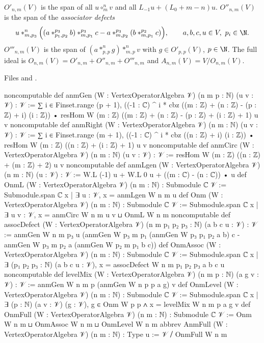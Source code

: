\begin{definition}\label{l13:def:onm}
$O'_{n,m}(V)$ is the span of all $u\circ^n_mv$ and all $L_{-1}u+(L_0+m-n)u$. $O''_{n,m}(V)$ is the span of the
\emph{associator defects}
\begin{equation*}
 u*^n_{m,p_3}\Bigl((a*^{p_3}_{p_1,p_2}b)*^{p_3}_{m,p_1}c - a*^{p_3}_{m,p_2}(b*^{p_2}_{m,p_1}c)\Bigr),\qquad a,b,c,u\in V,\ p_i\in\N.
\end{equation*}
$O'''_{n,m}(V)$ is the span of $(a*^n_{p,p}g)*^n_{m,p}v$ with $g\in O'_{p,p}(V)$, $p\in\N$. The full ideal is
$O_{n,m}(V) = O'_{n,m}+O''_{n,m}+O'''_{n,m}$ and $A_{n,m}(V) = V/O_{n,m}(V)$.
\end{definition}
\noindent Files  and
.
\begin{leancode}
noncomputable def anmGen (W : VertexOperatorAlgebra 𝒱) (n m p : ℕ) (u v : 𝒱) : 𝒱 :=
  ∑ i ∈ Finset.range (p + 1),
    ((-1 : ℂ) ^ i * cbz ((m : ℤ) + (n : ℤ) - (p : ℤ) + i) (i : ℤ))
      • resHom W (m : ℤ) ((m : ℤ) + (n : ℤ) - (p : ℤ) + (i : ℤ) + 1) u v
noncomputable def anmRight (W : VertexOperatorAlgebra 𝒱) (n m : ℕ) (u v : 𝒱) : 𝒱 :=
  ∑ i ∈ Finset.range (m + 1),
    ((-1 : ℂ) ^ i * cbz ((n : ℤ) + i) (i : ℤ)) • resHom W (m : ℤ) ((n : ℤ) + (i : ℤ) + 1) u v
noncomputable def anmCirc (W : VertexOperatorAlgebra 𝒱) (n m : ℕ) (u v : 𝒱) : 𝒱 :=
  resHom W (m : ℤ) ((n : ℤ) + (m : ℤ) + 2) u v
noncomputable def anmLgen (W : VertexOperatorAlgebra 𝒱) (n m : ℕ) (u : 𝒱) : 𝒱 :=
  W.L (-1) u + W.L 0 u + ((m : ℂ) - (n : ℂ)) • u
def OnmL (W : VertexOperatorAlgebra 𝒱) (n m : ℕ) : Submodule ℂ 𝒱 :=
  Submodule.span ℂ {x | ∃ u : 𝒱, x = anmLgen W n m u}
def Onm (W : VertexOperatorAlgebra 𝒱) (n m : ℕ) : Submodule ℂ 𝒱 :=
  Submodule.span ℂ {x | ∃ u v : 𝒱, x = anmCirc W n m u v} ⊔ OnmL W n m
noncomputable def assocDefect (W : VertexOperatorAlgebra 𝒱) (n m p₁ p₂ p₃ : ℕ) (a b c u : 𝒱) : 𝒱 :=
  anmGen W n m p₃ u
    (anmGen W p₃ m p₁ (anmGen W p₃ p₁ p₂ a b) c
      - anmGen W p₃ m p₂ a (anmGen W p₂ m p₁ b c))
def OnmAssoc (W : VertexOperatorAlgebra 𝒱) (n m : ℕ) : Submodule ℂ 𝒱 :=
  Submodule.span ℂ
    {x | ∃ (p₁ p₂ p₃ : ℕ) (a b c u : 𝒱), x = assocDefect W n m p₁ p₂ p₃ a b c u}
noncomputable def levelMix (W : VertexOperatorAlgebra 𝒱) (n m p : ℕ) (a g v : 𝒱) : 𝒱 :=
  anmGen W n m p (anmGen W n p p a g) v
def OnmLevel (W : VertexOperatorAlgebra 𝒱) (n m : ℕ) : Submodule ℂ 𝒱 :=
  Submodule.span ℂ
    {x | ∃ (p : ℕ) (a v : 𝒱) (g : 𝒱), g ∈ Onm W p p ∧ x = levelMix W n m p a g v}
def OnmFull (W : VertexOperatorAlgebra 𝒱) (n m : ℕ) : Submodule ℂ 𝒱 :=
  Onm W n m ⊔ OnmAssoc W n m ⊔ OnmLevel W n m
abbrev AnmFull (W : VertexOperatorAlgebra 𝒱) (n m : ℕ) : Type u := 𝒱 ⧸ OnmFull W n m
\end{leancode}

